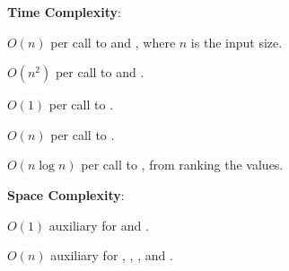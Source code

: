 \textbf{Time Complexity}:
\begin{compactitem}
  \item $O(n)$ per call to  and , where $n$ is the input size.
  \item $O(n^{2})$ per call to  and .
  \item $O(1)$ per call to .
  \item $O(n)$ per call to .
  \item $O(n \log n)$ per call to , from ranking the values.
\end{compactitem}

\textbf{Space Complexity}:
\begin{compactitem}
  \item $O(1)$ auxiliary for  and .
  \item $O(n)$ auxiliary for , , , and .
\end{compactitem}

